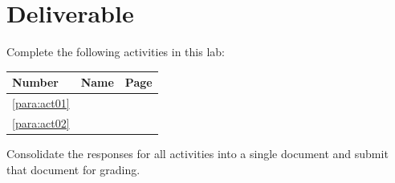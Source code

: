 \section{Deliverable}

Complete the following activities in this lab:

\begin{center}
  \begin{tabular}{lll}
    \hline 
    \textbf{Number} & \textbf{Name} & \textbf{Page} \\ 
    \hline 
    \ref{para:act01} & \nameref{para:act01} & \pageref{para:act01} \\ 
    \ref{para:act02} & \nameref{para:act02} & \pageref{para:act02} \\ 
    \hline 
  \end{tabular} 
\end{center}

Consolidate the responses for all activities into a single document and submit that document for grading.


